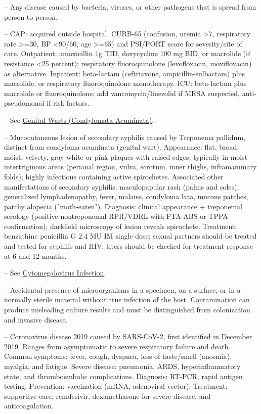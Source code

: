 -- Any disease caused by bacteria, viruses, or other pathogens that is spread from person to person.

-- CAP: acquired outside hospital. CURB-65 (confusion, uremia >7, respiratory rate >=30, BP <90/60, age >=65) and PSI/PORT score for severity/site of care. Outpatient: amoxicillin 1g TID, doxycycline 100 mg BID, or macrolide (if resistance <25 percent); respiratory fluoroquinolone (levofloxacin, moxifloxacin) as alternative. Inpatient: beta-lactam (ceftriaxone, ampicillin-sulbactam) plus macrolide, or respiratory fluoroquinolone monotherapy. ICU: beta-lactam plus macrolide or fluoroquinolone; add vancomycin/linezolid if MRSA suspected, anti-pseudomonal if risk factors.

-- See \hyperlink{Genital Warts (Condylomata Acuminata)}{Genital Warts (Condylomata Acuminata)}.

-- Mucocutaneous lesion of secondary syphilis caused by Treponema pallidum, distinct from condyloma acuminata (genital wart). Appearance: flat, broad, moist, velvety, gray-white or pink plaques with raised edges, typically in moist intertriginous areas (perianal region, vulva, scrotum, inner thighs, inframammary folds); highly infectious containing active spirochetes. Associated other manifestations of secondary syphilis: maculopapular rash (palms and soles), generalized lymphadenopathy, fever, malaise, condyloma lata, mucous patches, patchy alopecia ("moth-eaten"). Diagnosis: clinical appearance + treponemal serology (positive nontreponemal RPR/VDRL with FTA-ABS or TPPA confirmation); darkfield microscopy of lesion reveals spirochete. Treatment: benzathine penicillin G 2.4 MU IM single dose; sexual partners should be treated and tested for syphilis and HIV; titers should be checked for treatment response at 6 and 12 months.

-- See \hyperlink{Cytomegalovirus Infection}{Cytomegalovirus Infection}.

-- Accidental presence of microorganisms in a specimen, on a surface, or in a normally sterile material without true infection of the host. Contamination can produce misleading culture results and must be distinguished from colonization and invasive disease.

-- Coronavirus disease 2019 caused by SARS-CoV-2, first identified in December 2019. Ranges from asymptomatic to severe respiratory failure and death. Common symptoms: fever, cough, dyspnea, loss of taste/smell (anosmia), myalgia, and fatigue. Severe disease: pneumonia, ARDS, hyperinflammatory state, and thromboembolic complications. Diagnosis: RT-PCR, rapid antigen testing. Prevention: vaccination (mRNA, adenoviral vector). Treatment: supportive care, remdesivir, dexamethasone for severe disease, and anticoagulation.

